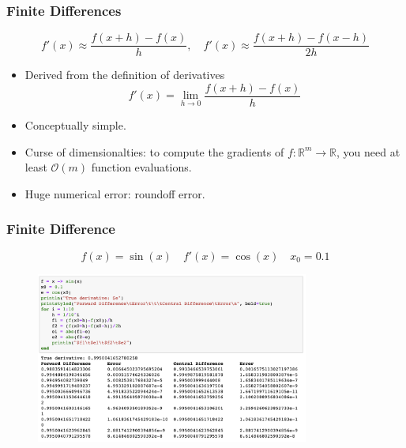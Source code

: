 \documentclass{beamer}
\newcommand{\RR}[0]{\mathbb{R}}
\begin{document}
\begin{frame}
	\frametitle{Finite Differences}


	$$f'(x) \approx \frac{f(x+h) - f(x)}{h},\quad f'(x)\approx \frac{f(x+h) - f(x-h)}{2h}$$
	\begin{itemize}
		\item Derived from the definition of derivatives
		      \begin{equation*}
			      f'(x) = \lim_{h\rightarrow 0} \frac{f(x+h)-f(x)}{h}
		      \end{equation*}
		\item Conceptually simple.
		\item Curse of dimensionalties: to compute the gradients of $f:\RR^m \rightarrow \RR$, you need at least $\mathcal{O}(m)$ function evaluations.
		\item Huge numerical error: roundoff error.
	\end{itemize}

\end{frame}


\begin{frame}
	\frametitle{Finite Difference}
	\begin{equation*}
		f(x) = \sin(x) \quad f'(x) = \cos(x) \quad  x_0 = 0.1
	\end{equation*}
	\begin{figure}[hbt]
		\centering
		\includegraphics[width=0.8\textwidth]{figures/roundoff}
	\end{figure}

\end{frame}
\end{document}
